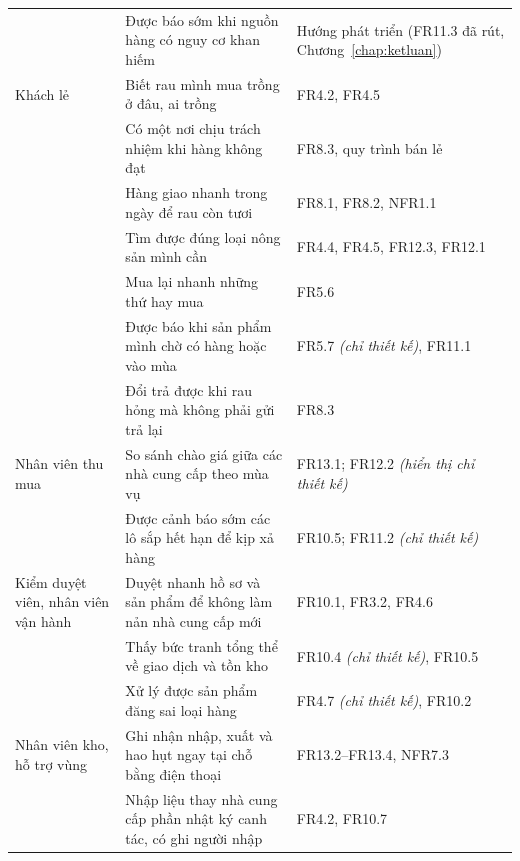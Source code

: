 \begin{longtable}{L{2.81cm} L{8.85cm} L{3.24cm}}
& Được báo sớm khi nguồn hàng có nguy cơ khan hiếm & Hướng phát triển (FR11.3 đã rút, Chương~\ref{chap:ketluan}) \\
Khách lẻ & Biết rau mình mua trồng ở đâu, ai trồng & FR4.2, FR4.5 \\
& Có một nơi chịu trách nhiệm khi hàng không đạt & FR8.3, quy trình bán lẻ \\
& Hàng giao nhanh trong ngày để rau còn tươi & FR8.1, FR8.2, NFR1.1 \\
& Tìm được đúng loại nông sản mình cần & FR4.4, FR4.5, FR12.3, FR12.1 \\
& Mua lại nhanh những thứ hay mua & FR5.6 \\
& Được báo khi sản phẩm mình chờ có hàng hoặc vào mùa & FR5.7 \emph{(chỉ thiết kế)}, FR11.1 \\
& Đổi trả được khi rau hỏng mà không phải gửi trả lại & FR8.3 \\
Nhân viên thu mua & So sánh chào giá giữa các nhà cung cấp theo mùa vụ & FR13.1; FR12.2 \emph{(hiển thị chỉ thiết kế)} \\
& Được cảnh báo sớm các lô sắp hết hạn để kịp xả hàng & FR10.5; FR11.2 \emph{(chỉ thiết kế)} \\
Kiểm duyệt viên, nhân viên vận hành & Duyệt nhanh hồ sơ và sản phẩm để không làm nản nhà cung cấp mới & FR10.1, FR3.2, FR4.6 \\
& Thấy bức tranh tổng thể về giao dịch và tồn kho & FR10.4 \emph{(chỉ thiết kế)}, FR10.5 \\
& Xử lý được sản phẩm đăng sai loại hàng & FR4.7 \emph{(chỉ thiết kế)}, FR10.2 \\
Nhân viên kho, hỗ trợ vùng & Ghi nhận nhập, xuất và hao hụt ngay tại chỗ bằng điện thoại & FR13.2--FR13.4, NFR7.3 \\
& Nhập liệu thay nhà cung cấp phần nhật ký canh tác, có ghi người nhập & FR4.2, FR10.7 \\
\end{longtable}
\endgroup

